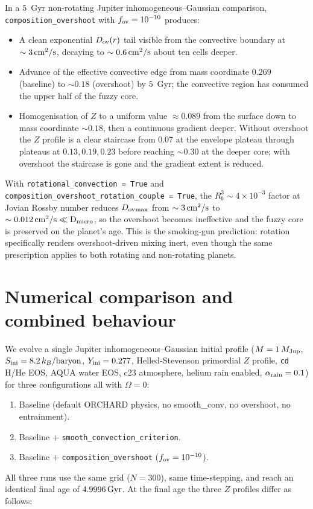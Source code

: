 \documentclass{aastex631}
\newcommand{\Mjup}{M_{\rm Jup}}
\newcommand{\Dov}{D_{\rm ov}}
\newcommand{\Dmicro}{D_{\rm micro}}
\newcommand{\fov}{f_{\rm ov}}
\begin{document}
In a $5$~Gyr non-rotating Jupiter inhomogeneous--Gaussian comparison,
\texttt{composition\_overshoot} with $\fov = 10^{-10}$ produces:
\begin{itemize}
\item A clean exponential $\Dov(r)$ tail visible from the convective
  boundary at $\sim 3\,\rm cm^2/s$, decaying to $\sim 0.6\,\rm cm^2/s$
  about ten cells deeper.
\item Advance of the effective convective edge from mass coordinate
  $0.269$ (baseline) to $\sim 0.18$ (overshoot) by $5$~Gyr; the
  convective region has consumed the upper half of the fuzzy core.
\item Homogenisation of $Z$ to a uniform value $\approx 0.089$ from
  the surface down to mass coordinate $\sim 0.18$, then a continuous
  gradient deeper.  Without overshoot the $Z$ profile is a clear
  staircase from $0.07$ at the envelope plateau through plateaus at
  $0.13, 0.19, 0.23$ before reaching $\sim 0.30$ at the deeper core;
  with overshoot the staircase is gone and the gradient extent is
  reduced.
\end{itemize}
With \texttt{rotational\_convection = True} and
\texttt{composition\_overshoot\_rotation\_couple = True}, the
$R_b^3 \sim 4\times 10^{-3}$ factor at Jovian Rossby number reduces
$\Dov{}_{\rm max}$ from $\sim 3\,\rm cm^2/s$ to $\sim 0.012\,\rm cm^2/s
\ll \Dmicro$, so the overshoot becomes ineffective and the fuzzy core
is preserved on the planet's age.  This is the smoking-gun
\citeauthor{Fuentes2023ApJL} prediction: rotation specifically renders
overshoot-driven mixing inert, even though the same prescription
applies to both rotating and non-rotating planets.

\section{Numerical comparison and combined behaviour}\label{sec:results}

We evolve a single Jupiter inhomogeneous--Gaussian initial profile
($M = 1\,\Mjup$, $S_{\rm ini} = 8.2\,k_B/\mathrm{baryon}$,
$Y_{\rm ini} = 0.277$, Helled-Stevenson primordial $Z$ profile,
\texttt{cd} H/He EOS, AQUA water EOS, c23 atmosphere, helium rain
enabled, $\alpha_{\rm rain} = 0.1$) for three configurations all with
$\Omega = 0$:
\begin{enumerate}
\item Baseline (default ORCHARD physics, no smooth\_conv, no overshoot,
  no entrainment).
\item Baseline + \texttt{smooth\_convection\_criterion}.
\item Baseline + \texttt{composition\_overshoot} ($\fov = 10^{-10}$).
\end{enumerate}
All three runs use the same grid ($N = 300$), same time-stepping, and
reach an identical final age of $4.9996\,\rm Gyr$.  At the
final age the three $Z$ profiles differ as follows:
\end{document}
